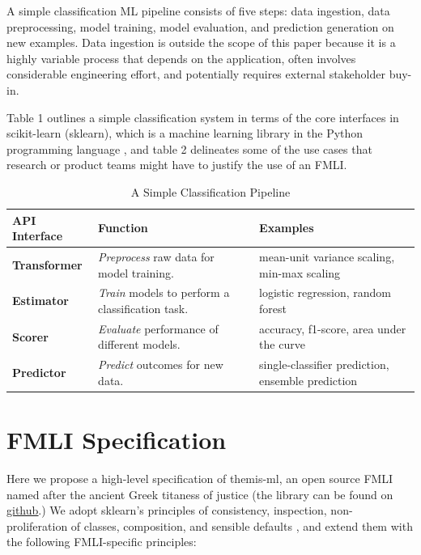 \documentclass{{interact/interact}}
\begin{document}
A simple classification ML pipeline consists of five steps: data ingestion, data
preprocessing, model training, model evaluation, and prediction generation on
new examples. Data ingestion is outside the scope of this paper because it is a
highly variable process that depends on the application, often involves
considerable engineering effort, and potentially requires external stakeholder
buy-in.

Table 1 outlines a simple classification system in terms of the core interfaces
in scikit-learn (sklearn), which is a machine learning library in the Python
programming language \cite{buitinck2013api}, and table 2 delineates some of the
use cases that research or product teams might have to justify the use of an
FMLI.


\begin{table}
  \caption{A Simple Classification Pipeline}
  \renewcommand{\arraystretch}{1.75}
  \small\noindent\begin{tabularx}{\linewidth}{l X X}
    \textbf{API Interface} & \textbf{Function} & \textbf{Examples} \\
    \hline
    \textbf{Transformer} &
      \emph{Preprocess} raw data for model training. &
      mean-unit variance scaling, min-max scaling \\
    \textbf{Estimator} &
      \emph{Train} models to perform a classification task. &
      logistic regression, random forest \\
    \textbf{Scorer} &
      \emph{Evaluate} performance of different models. &
      accuracy, f1-score, area under the curve \\
    \textbf{Predictor} &
      \emph{Predict} outcomes for new data. &
      single-classifier prediction, ensemble prediction
  \end{tabularx}
\end{table}


\section{FMLI Specification}

Here we propose a high-level specification of themis-ml, an open source FMLI
named after the ancient Greek titaness of justice (the library can be found on
\href{https://github.com/cosmicBboy/themis-ml}{\underline{github}}.)  We adopt
sklearn's principles of consistency, inspection, non- proliferation of classes,
composition, and sensible defaults \cite{buitinck2013api}, and extend them with
the following FMLI-specific principles:
\end{document}
